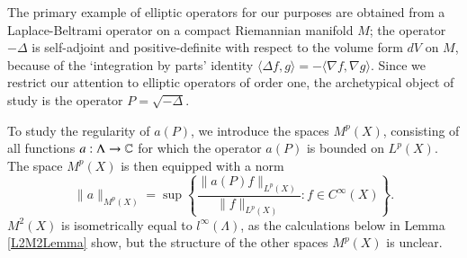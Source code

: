 %
%

The primary example of elliptic operators for our purposes are obtained from a Laplace-Beltrami operator on a compact Riemannian manifold $M$; the operator $-\Delta$ is self-adjoint and positive-definite with respect to the volume form $dV$ on $M$, because of the `integration by parts' identity $\langle \Delta f, g \rangle = - \langle \nabla f, \nabla g \rangle$. Since we restrict our attention to elliptic operators of order one, the archetypical object of study is the operator $P = \sqrt{-\Delta}$.

To study the regularity of $a(P)$, we introduce the spaces $M^p(X)$, consisting of all functions $a: \Lambda \to \operatorname{\mathbb{C}}$ for which the operator $a(P)$ is  bounded on $L^p(X)$. The space $M^p(X)$ is then equipped with a norm
%
\begin{equation}
  \| a \|_{M^p(X)} = \sup \left\{ \frac{\| a(P) f \|_{L^p(X)}}{\| f \|_{L^p(X)}} : f \in C^\infty(X) \right\}.
\end{equation}
%
$M^2(X)$ is isometrically equal to $l^\infty(\Lambda)$, as the calculations below in Lemma \ref{L2M2Lemma} show, but the structure of the other spaces $M^p(X)$ is unclear.

